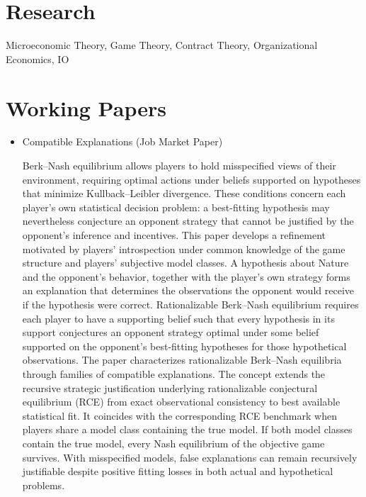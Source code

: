 \documentclass[11pt]{article}
\newlength{\oneli}
\begin{document}
\section*{Research}
Microeconomic Theory, Game Theory, Contract Theory, Organizational Economics, IO


\section*{Working Papers}
\begin{itemize}[leftmargin=0em, nosep, itemsep=4pt]
\item   Compatible Explanations (Job Market Paper)\par\vspace{\oneli}
Berk--Nash equilibrium allows players to hold misspecified views of their environment, requiring optimal actions under beliefs supported on hypotheses that minimize
Kullback--Leibler divergence. These conditions concern each player's own statistical decision problem: a best-fitting hypothesis may nevertheless conjecture an opponent strategy that cannot be justified by the opponent's inference and incentives.
%
This paper develops a refinement motivated by players' introspection under common knowledge of the game structure and players' subjective model classes. 
A hypothesis about Nature and the opponent's behavior, together with the player's own strategy forms an explanation that determines the observations the opponent would receive if the hypothesis were correct. Rationalizable Berk--Nash equilibrium requires each player to have a supporting belief such that every hypothesis in its support conjectures an opponent strategy optimal under some belief supported on the opponent's best-fitting hypotheses for those hypothetical observations. 
%
The paper characterizes rationalizable Berk--Nash equilibria through families of compatible explanations. The concept extends the recursive strategic justification underlying rationalizable conjectural equilibrium (RCE) from exact observational consistency to best available statistical fit. 
It coincides with the corresponding RCE benchmark when players share a model class containing the true model. 
If both model classes contain the true model, every Nash equilibrium of the objective game survives. 
With misspecified models, false explanations can remain recursively justifiable despite positive fitting losses in both actual and hypothetical problems.
\end{itemize}
\end{document}
